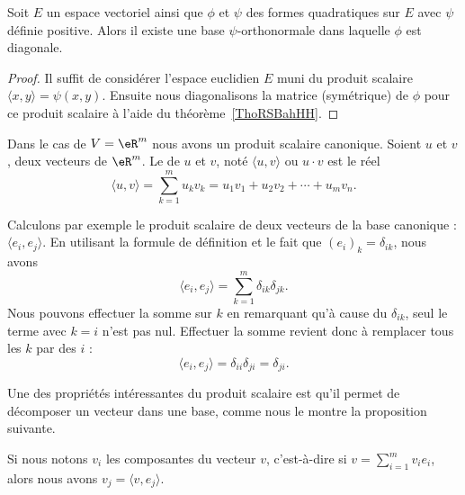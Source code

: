 \begin{corollary}   \label{CorSMHpoVK}
    Soit \( E\) un espace vectoriel ainsi que \( \phi\) et \( \psi\) des formes quadratiques sur \( E\) avec \( \psi\) définie positive. Alors il existe une base \( \psi\)-orthonormale dans laquelle \( \phi\) est diagonale.
\end{corollary}

\begin{proof}
    Il suffit de considérer l'espace euclidien \( E\) muni du produit scalaire \( \langle x, y\rangle =\psi(x,y)\). Ensuite nous diagonalisons la matrice (symétrique) de \( \phi\) pour ce produit scalaire à l'aide du théorème~\ref{ThoRSBahHH}.
\end{proof}

\begin{definition}      \label{DefYNWUFc}
    Dans le cas de \( V=\eR^m\) nous avons un produit scalaire canonique. Soient $u$ et $v$, deux vecteurs de $\eR^m$. Le  de $u$ et $v$, noté $\langle u, v\rangle $ ou $u\cdot v$ est le réel
	\begin{equation}		\label{EqDefProdScalsumii}
		\langle u, v\rangle =\sum_{k=1}^m u_kv_k=u_1v_1+u_2v_2+\cdots+u_mv_n.
	\end{equation}
\end{definition}

Calculons par exemple le produit scalaire de deux vecteurs de la base canonique : $\langle e_i, e_j\rangle $. En utilisant la formule de définition et le fait que $(e_i)_k=\delta_{ik}$, nous avons
\begin{equation}
	\langle e_i, e_j\rangle =\sum_{k=1}^m\delta_{ik}\delta_{jk}.
\end{equation}
Nous pouvons effectuer la somme sur $k$ en remarquant qu'à cause du $\delta_{ik}$, seul le terme avec $k=i$ n'est pas nul. Effectuer la somme revient donc à remplacer tous les $k$ par des $i$ :
\begin{equation}
	\langle e_i, e_j\rangle =\delta_{ii}\delta_{ji}=\delta_{ji}.
\end{equation}

Une des propriétés intéressantes du produit scalaire est qu'il permet de décomposer un vecteur dans une base, comme nous le montre la proposition suivante.

\begin{proposition}		\label{PropScalCompDec}
	Si nous notons $v_i$ les composantes du vecteur $v$, c'est-à-dire si $v=\sum_{i=1}^m v_ie_i$, alors nous avons $v_j=\langle v, e_j\rangle $.
\end{proposition}

